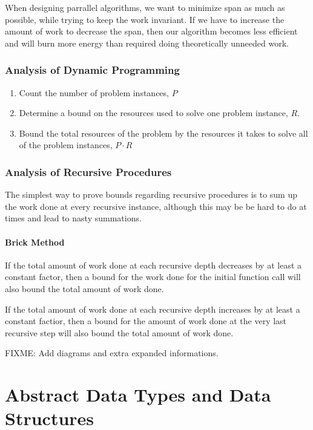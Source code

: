 \documentclass[12pt, letterpaper]{book}
\begin{document}
When designing parrallel algorithms, we want to minimize span as much as possible, while trying to keep the work invariant. If we have to increase the amount of work to decrease the span, then our algorithm becomes less efficient and will burn more energy than required doing theoretically unneeded work.

\section{Analysis of Dynamic Programming}

\begin{enumerate}
  \item Count the number of problem instances, $P$
  \item Determine a bound on the resources used to solve one problem instance, $R$.
  \item Bound the total resources of the problem by the resources it takes to solve all of the problem instances, $P \cdot R$
\end{enumerate}

\section{Analysis of Recursive Procedures}

The simplest way to prove bounds regarding recursive procedures is to sum up the work done at every recursive instance, although this may be be hard to do at times and lead to nasty summations.

\subsection{Brick Method}

If the total amount of work done at each recursive depth decreases by at least a constant factor, then a bound for the work done for the initial function call will also bound the total amount of work done.

If the total amount of work done at each recursive depth increases by at least a constant factior, then a bound for the amount of work done at the very last recursive step will also bound the total amount of work done.

FIXME: Add diagrams and extra expanded informations.


\part{Abstract Data Types and Data Structures}
\end{document}
